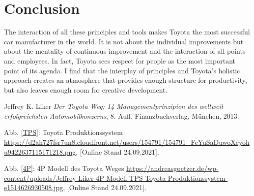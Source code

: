 \documentclass[a4paper,12pt]{scrartcl}
\begin{document}
\clearpage
  
\section{Conclusion}

The interaction of all these principles and tools makes Toyota the most successful car manufacturer in the world. It is not about the individual improvements but about the mentality of continuous improvement and the interaction of all points and employees. In fact, Toyota sees respect for people as the most important point of its agenda. I find that the interplay of principles and Toyota's holistic approach creates an atmosphere that provides enough structure for productivity, but also leaves enough room for creative development. 

\clearpage
{}
\begin{thebibliography}{99}

 Jeffrey K. Liker \emph{Der Toyota Weg; 14 Managementprinzipien des weltweit erfolgreichsten Automobilkonzerns}, 8. Aufl. Finanzbuchverlag, München, 2013.


 Abb. \ref{TPS}: Toyota Produktionssystem \url{https://d2ah727fsr7un8.cloudfront.net/users/154791/154791_FeYuSaDuwoXeyohu9422637115171218.png}, [Online Stand 24.09.2021].

 Abb. \ref{4P}: 4P Modell des Toyota Weges \url{https://andreasgoetzer.de/wp-content/uploads/Jeffrey-Liker-4P-Modell-TPS-Toyota-Produktionssystem-e1514626930508.jpg}, [Online Stand 24.09.2021].

\end{thebibliography}
\end{document}
